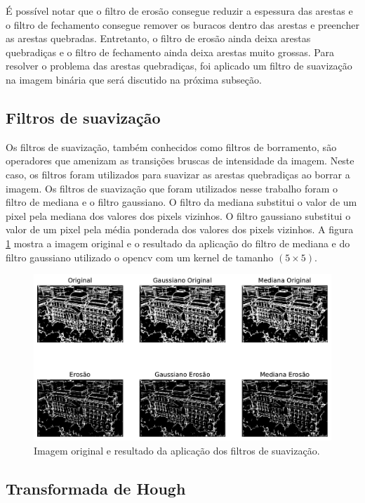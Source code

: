 \documentclass[12pt]{article}
\begin{document}
É possível notar que o filtro de erosão consegue reduzir a espessura das arestas e o filtro de fechamento consegue remover os buracos dentro das arestas e preencher as arestas quebradas. Entretanto, o filtro de erosão ainda deixa arestas quebradiças e o filtro de fechamento ainda deixa arestas muito grossas. Para resolver o problema das arestas quebradiças, foi aplicado um filtro de suavização na imagem binária que será discutido na próxima subseção.

\subsection{Filtros de suavização}

Os filtros de suavização, também conhecidos como filtros de borramento, são operadores que amenizam as transições bruscas de intensidade da imagem. Neste caso, os filtros foram utilizados para suavizar as arestas quebradiças ao borrar a imagem. Os filtros de suavização que foram utilizados nesse trabalho foram o filtro de mediana e o filtro gaussiano. O filtro da mediana substitui o valor de um pixel pela mediana dos valores dos pixels vizinhos. O filtro gaussiano substitui o valor de um pixel pela média ponderada dos valores dos pixels vizinhos. A figura \ref{fig:blur} mostra a imagem original e o resultado da aplicação do filtro de mediana e do filtro gaussiano utilizado o opencv \cite{opencv_blur} com um kernel de tamanho $(5\times5)$.

\begin{figure}
\centering
\includegraphics[scale=0.60]{blur.pdf}
\caption{Imagem original e resultado da aplicação dos filtros de suavização.}
\label{fig:blur}
\end{figure}


\subsection{Transformada de Hough}
\end{document}
